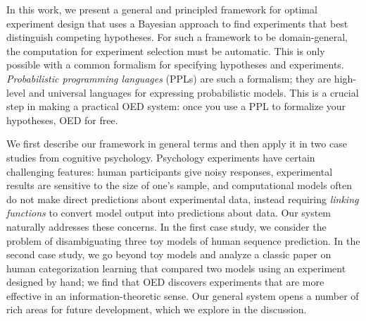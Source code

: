 \documentclass{article}
\newcommand{\ndg}[1]{\textcolor{Green}{[ndg: #1]}}
\begin{document}
In this work, we present a general and principled framework for optimal experiment design that uses a Bayesian approach to find experiments that best distinguish competing hypotheses.
For such a framework to be domain-general, the computation for experiment selection must be automatic.
This is only possible with a common formalism for specifying hypotheses and experiments.
\emph{Probabilistic programming languages} (PPLs) are such a formalism; they are high-level and universal languages for expressing probabilistic models.
This is a crucial step in making a practical OED system: once you use a PPL to formalize your hypotheses, OED for free.

We first describe our framework in general terms and then apply it in two case studies from cognitive psychology.
Psychology experiments have certain challenging features: human participants give noisy responses, experimental results are sensitive to the size of one's sample, and computational models often do not make direct predictions about experimental data, instead requiring \emph{linking functions} to convert model output into predictions about data.
Our system naturally addresses these concerns.
In the first case study, we consider the problem of disambiguating three toy models of human sequence prediction.
In the second case study, we go beyond toy models and analyze a classic paper on human categorization learning that compared two models using an experiment designed by hand; we find that OED discovers experiments that are more effective in an information-theoretic sense.
Our general system opens a number of rich areas for future development, which we explore in the discussion.

\end{document}
